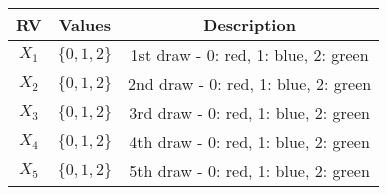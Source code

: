 
\begin{center}
\begin{tabular}{|c|c|c|}
\hline
\textbf{RV}& \textbf{Values} & \textbf{Description} \\ \hline
$X_1$		   & 	$\{0,1,2\}$	&  1st draw - 0: red, 1: blue, 2: green\\ \hline
$X_2$		   & 	$\{0,1,2\}$	&  2nd draw - 0: red, 1: blue, 2: green\\ \hline
$X_3$		   & 	$\{0,1,2\}$	&  3rd draw - 0: red, 1: blue, 2: green\\ \hline
$X_4$		   & 	$\{0,1,2\}$	&  4th draw - 0: red, 1: blue, 2: green\\ \hline
$X_5$		   & 	$\{0,1,2\}$	&  5th draw - 0: red, 1: blue, 2: green\\ \hline
\end{tabular}
\end{center}
